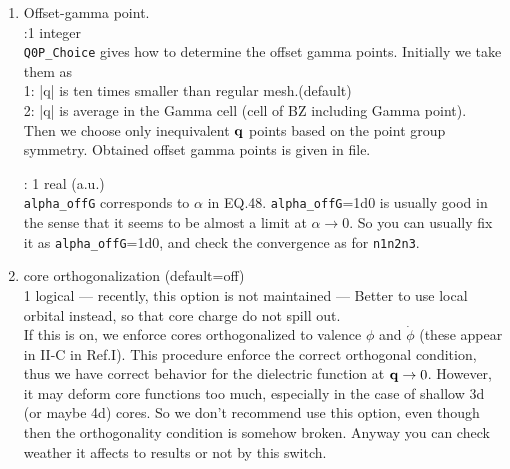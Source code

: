 {\begin{enumerate}
\item 
Offset-gamma point.\\
:1 integer\\
{\tt Q0P\_Choice} gives how to determine the offset gamma points.
Initially we take them as\\
1: |q| is ten times smaller than regular mesh.(default)\\
2: |q| is average in the Gamma cell (cell of BZ including Gamma point). \\
Then we choose only inequivalent ${\bf q}$ points
based on the point group symmetry.
Obtained offset gamma points is given in  file.

: 1 real (a.u.) \\
{\tt alpha\_offG} corresponds to $\alpha$ in EQ.48.
{\tt alpha\_offG}=1d0 is usually good in the sense that
it seems to be almost a limit at $\alpha \to 0$.
So you can usually fix it as {\tt alpha\_offG}=1d0, and check the
convergence as for {\tt n1n2n3}.




\item core orthogonalization (default=off)\\
 1 logical --- recently, this option is not maintained
--- Better to use local orbital instead, so that core charge do not spill out.\\
If this is on, we enforce cores orthogonalized to valence 
$\phi$ and $\dot{\phi}$ (these appear in II-C in Ref.I).
This procedure enforce the correct orthogonal condition, thus
we have correct behavior for the dielectric function at ${\bf q} \to 0$.
However, it may deform core functions too much, 
especially in the case of shallow 3d (or maybe 4d) cores.
So we don't recommend use this option, even though then 
the orthogonality condition is somehow broken.
Anyway you can check weather it affects to results or not by this switch.


\end{enumerate}}
